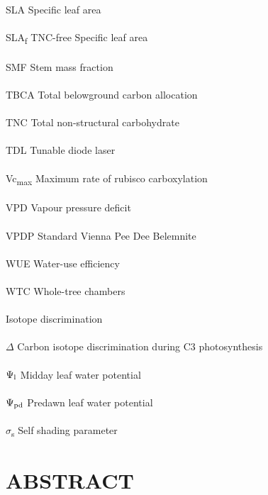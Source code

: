 \documentclass[a4paper]{article}\usepackage[]{graphicx}\usepackage[]{color}
\begin{document}
SLA Specific leaf area
\\
\\
SLA\textsubscript{f}  TNC-free Specific leaf area
\\
\\
SMF Stem mass fraction
\\
\\
TBCA Total belowground carbon allocation
\\
\\
TNC Total non-structural carbohydrate
\\
\\
TDL Tunable diode laser
\\
\\
Vc\textsubscript{max} Maximum rate of rubisco carboxylation 
\\
\\
VPD Vapour pressure deficit
\\
\\
VPDP Standard Vienna Pee Dee Belemnite
\\
\\
WUE Water-use efficiency
\\
\\
WTC Whole-tree chambers
\\
\\
{\textdelta}  Isotope discrimination
\\
\\
$\Delta$ Carbon isotope discrimination during C3 photosynthesis 
\\
\\
$\Psi\textsubscript{l}$ Midday leaf water potential
\\
\\
$\Psi\textsubscript{pd}$  Predawn leaf water potential
\\
\\
$\sigma$\textsubscript{s} Self shading parameter

\clearpage
\section*{ABSTRACT}
\end{document}
